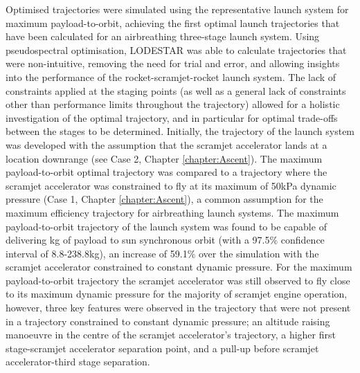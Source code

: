 Optimised trajectories were simulated using the representative launch system for maximum payload-to-orbit, achieving the first optimal launch trajectories that have been calculated for an airbreathing three-stage launch system. Using pseudospectral optimisation, LODESTAR was able to calculate trajectories that were non-intuitive, removing the need for trial and error, and allowing insights into the performance of the rocket-scramjet-rocket launch system. The lack of constraints applied at the staging points (as well as a general lack of constraints other than performance limits throughout the trajectory) allowed for a holistic investigation of the optimal trajectory, and in particular for optimal trade-offs between the stages to be determined.
Initially, the trajectory of the launch system was developed with the assumption that the scramjet accelerator lands at a location downrange (see Case 2, Chapter \ref{chapter:Ascent}).
The maximum payload-to-orbit optimal trajectory was compared to a trajectory where the scramjet accelerator was constrained to fly at its maximum of 50kPa dynamic pressure (Case 1, Chapter \ref{chapter:Ascent}), a common assumption for the maximum efficiency trajectory for airbreathing launch systems. 
The maximum payload-to-orbit trajectory of the launch system was found to be capable of delivering \PayloadToOrbitStandardNoReturn kg of payload to sun synchronous orbit (with a 97.5\% confidence interval of 8.8-238.8kg), an increase of 59.1\% over the simulation with the scramjet accelerator constrained to constant dynamic pressure. For the maximum payload-to-orbit trajectory the scramjet accelerator was still observed to fly close to its maximum dynamic pressure for the majority of scramjet engine operation, however, three key features were observed in the trajectory that were not present in a trajectory constrained to constant dynamic pressure; an altitude raising manoeuvre in the centre of the scramjet accelerator's trajectory, a higher first stage-scramjet accelerator separation point, and a pull-up before scramjet accelerator-third stage separation.


